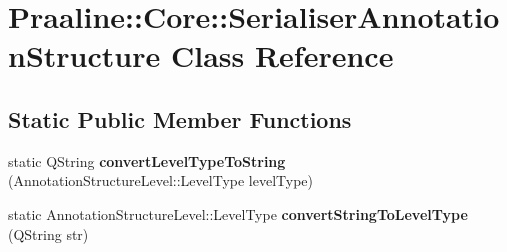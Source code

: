\hypertarget{class_praaline_1_1_core_1_1_serialiser_annotation_structure}{}\section{Praaline\+:\+:Core\+:\+:Serialiser\+Annotation\+Structure Class Reference}
\label{class_praaline_1_1_core_1_1_serialiser_annotation_structure}
\subsection*{Static Public Member Functions}
\begin{DoxyCompactItemize}
\item 
\mbox{\label{class_praaline_1_1_core_1_1_serialiser_annotation_structure_ab12b423b1ffdbf1991a2f89d3abbfdb0}} 
static Q\+String {\bfseries convert\+Level\+Type\+To\+String} (Annotation\+Structure\+Level\+::\+Level\+Type level\+Type)
\item 
\mbox{\label{class_praaline_1_1_core_1_1_serialiser_annotation_structure_a501c3f2647f9be4483a77eff22db318d}} 
static Annotation\+Structure\+Level\+::\+Level\+Type {\bfseries convert\+String\+To\+Level\+Type} (Q\+String str)
\end{DoxyCompactItemize}
